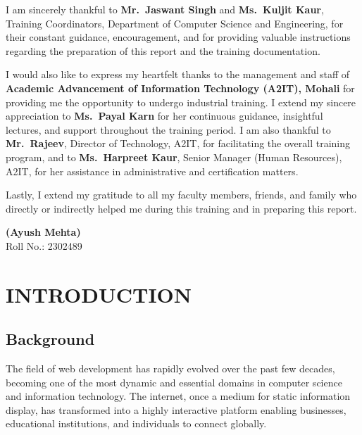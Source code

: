 \documentclass[a4paper,12pt,oneside]{report}
\numberwithin{equation}{chapter}
\numberwithin{figure}{chapter}
\numberwithin{table}{chapter}
\begin{document}
I am sincerely thankful to \textbf{Mr.~Jaswant Singh} and \textbf{Ms.~Kuljit Kaur}, Training Coordinators, Department of Computer Science and Engineering, for their constant guidance, encouragement, and for providing valuable instructions regarding the preparation of this report and the training documentation.

I would also like to express my heartfelt thanks to the management and staff of \textbf{Academic Advancement of Information Technology (A2IT), Mohali} for providing me the opportunity to undergo industrial training. I extend my sincere appreciation to \textbf{Ms.~Payal Karn} for her continuous guidance, insightful lectures, and support throughout the training period. I am also thankful to \textbf{Mr.~Rajeev}, Director of Technology, A2IT, for facilitating the overall training program, and to \textbf{Ms.~Harpreet Kaur}, Senior Manager (Human Resources), A2IT, for her assistance in administrative and certification matters.

Lastly, I extend my gratitude to all my faculty members, friends, and family who directly or indirectly helped me during this training and in preparing this report.

\vspace{10mm}
\noindent
\textbf{(Ayush Mehta)}\\
Roll No.: 2302489

\tableofcontents
\listoffigures
\listoftables


\newpage

\setcounter{page}{1}

\chapter{INTRODUCTION}

\section{Background}

The field of web development has rapidly evolved over the past few decades, becoming one of the most dynamic and essential domains in computer science and information technology. The internet, once a medium for static information display, has transformed into a highly interactive platform enabling businesses, educational institutions, and individuals to connect globally.
\end{document}
